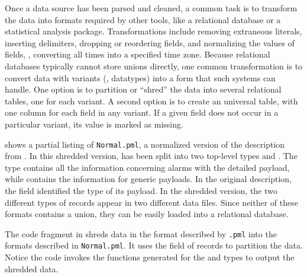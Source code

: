 Once a data source has been parsed and cleaned, a common task is to
transform the data into formats required by other tools, like a
relational database or a statistical analysis package.
Transformations include removing extraneous literals, inserting
delimiters, dropping or reordering fields, and normalizing the values
of fields, \eg{}, converting all times into a specified time zone.
Because relational databases typically cannot store unions directly,
one common transformation is to convert data with variants (\ie{},
datatypes) into a form that such systems can handle.  One option is to
partition or ``shred'' the data into several relational tables, one
for each variant.  A second option is to create an universal table,
with one column for each field in any variant.  If a given field does
not occur in a particular variant, its value is marked as missing.

 shows a partial listing of
\texttt{\darkstar{}Normal.pml}, a normalized version of the
\darkstar{} description from . In this
shredded version,  has been split into two top-level types
 and .  The type  contains all
the information concerning alarms with the detailed payload, while
 contains the information for generic payloads.  In the
original description, the  field identified the type of its
payload.  In the shredded version, the two different types of records
appear in two different data files. Since neither of these formats
contains a union, they can be easily loaded into a relational
database.

The code fragment in  shreds \darkstar{}
data in the format described by \texttt{\darkstar{}.pml} into the
formats described in \texttt{\darkstar{}Normal.pml}.  It uses the
 field of  records to partition the data. 
Notice the code invokes the  functions generated for the  and  types to output the shredded data.

